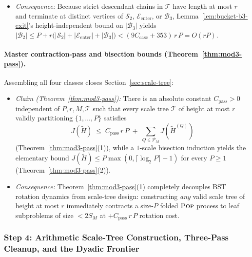 \documentclass[11pt]{article}
\theoremstyle{definition}
\theoremstyle{remark}
\newcommand{\POP}{\textnormal{\scshape Pop}}
\begin{document}
\begin{enumerate}[label=(\arabic*), leftmargin=2em, itemsep=2pt]
\begin{itemize}[leftmargin=1.5em, itemsep=1pt]
    \item \emph{Consequence:} Because strict descendant chains in $\mathcal{T}$ have length at most $r$ and terminate at distinct vertices of $\mathcal{S}_2$, $\mathcal{E}_{\mathrm{enter}}$, or $\mathcal{B}_3$, Lemma~\ref{lem:bucket-b3-exit}'s height-independent bound on $|\mathcal{B}_3|$ yields $|\mathcal{B}_2| \le P + r\big(|\mathcal{S}_2| + |\mathcal{E}_{\mathrm{enter}}| + |\mathcal{B}_3|\big) < (9 C_{\mathrm{casc}} + 353)\,r\,P = O(r P)$.
  \end{itemize}
\end{enumerate}

\paragraph{Master contraction-pass and bisection bounds (Theorem~\ref{thm:mod3-pass}).}
Assembling all four classes closes Section~\ref{sec:scale-tree}:
\begin{itemize}[leftmargin=2em, itemsep=2pt]
  \item \emph{Claim (Theorem~\ref{thm:mod3-pass}):} There is an absolute constant $C_{\mathrm{pass}} > 0$ independent of $P, r, M, \mathcal{T}$ such that every scale tree $\mathcal{T}$ of height at most $r$ validly partitioning $\{1, \dots, P\}$ satisfies
  \[
  J(\widetilde{H}) \;\le\; C_{\mathrm{pass}}\,r\,P \;+\; \sum_{Q \in \mathcal{P}_M} J(\widetilde{H}^{(Q)})
  \]
  (Theorem~\ref{thm:mod3-pass}(1)), while a $1$-scale bisection induction yields the elementary bound $J(\widetilde{H}) \le P \max(0, \lceil \log_2 P \rceil - 1)$ for every $P \ge 1$ (Theorem~\ref{thm:mod3-pass}(2)).
  \item \emph{Consequence:} Theorem~\ref{thm:mod3-pass}(1) completely decouples BST rotation dynamics from scale-tree design: constructing \emph{any} valid scale tree of height at most $r$ immediately contracts a size-$P$ folded $\POP$ process to leaf subproblems of size $< 2 S_M$ at $+C_{\mathrm{pass}}\,r\,P$ rotation cost.
\end{itemize}

\subsubsection{Step 4: Arithmetic Scale-Tree Construction, Three-Pass Cleanup, and the Dyadic Frontier}
\label{subsubsec:step45}
\end{document}
